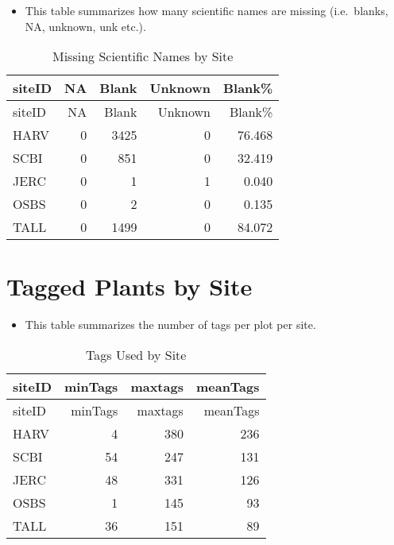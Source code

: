 \documentclass[]{article}
\begin{document}
\begin{itemize}
\itemsep1pt\parskip0pt
\item
  This table summarizes how many scientific names are missing
  (i.e.~blanks, NA, unknown, unk etc.).
\end{itemize}

\begin{longtable}[c]{@{}lrrrr@{}}
\caption{Missing Scientific Names by Site}\tabularnewline
\toprule
siteID & NA & Blank & Unknown & Blank\%\tabularnewline
\midrule
\endfirsthead
\toprule
siteID & NA & Blank & Unknown & Blank\%\tabularnewline
\midrule
\endhead
HARV & 0 & 3425 & 0 & 76.468\tabularnewline
SCBI & 0 & 851 & 0 & 32.419\tabularnewline
JERC & 0 & 1 & 1 & 0.040\tabularnewline
OSBS & 0 & 2 & 0 & 0.135\tabularnewline
TALL & 0 & 1499 & 0 & 84.072\tabularnewline
\bottomrule
\end{longtable}

\section{Tagged Plants by Site}\label{tagged-plants-by-site}

\begin{itemize}
\itemsep1pt\parskip0pt
\item
  This table summarizes the number of tags per plot per site.
\end{itemize}

\begin{longtable}[c]{@{}lrrr@{}}
\caption{Tags Used by Site}\tabularnewline
\toprule
siteID & minTags & maxtags & meanTags\tabularnewline
\midrule
\endfirsthead
\toprule
siteID & minTags & maxtags & meanTags\tabularnewline
\midrule
\endhead
HARV & 4 & 380 & 236\tabularnewline
SCBI & 54 & 247 & 131\tabularnewline
JERC & 48 & 331 & 126\tabularnewline
OSBS & 1 & 145 & 93\tabularnewline
TALL & 36 & 151 & 89\tabularnewline
\bottomrule
\end{longtable}
\end{document}

